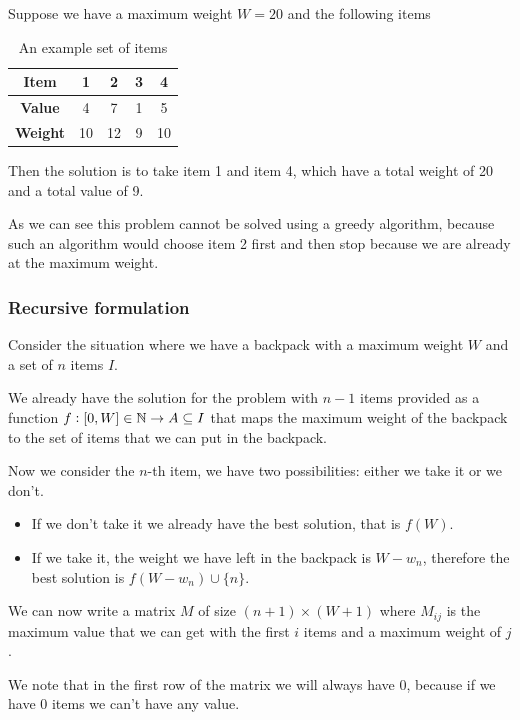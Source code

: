 \documentclass[12pt]{extarticle}
\begin{document}
Suppose we have a maximum weight $W = 20$ and the following items

\begin{table}[H]
    \centering
    \begin{tabular}{ |c|c|c|c|c| }
        \hline
        \textbf{Item}   & 1  & 2  & 3 & 4  \\
        \hline
        \textbf{Value}  & 4  & 7  & 1 & 5  \\
        \textbf{Weight} & 10 & 12 & 9 & 10 \\
        \hline
    \end{tabular}

    \label{tab:knapsack_example}
    \caption{An example set of items}
\end{table}

Then the solution is to take item 1 and item 4, which have a total weight of 20 and a total value of 9.

As we can see this problem cannot be solved using a greedy algorithm, because such an algorithm would choose item 2 first and then stop because we are already at the maximum weight.

\subsubsection{Recursive formulation}

Consider the situation where we have a backpack with a maximum weight $W$ and a set of $n$ items $I$.

We already have the solution for the problem with $n-1$ items provided as a function $f : [0, W] \in \mathbb{N} \to A \subseteq I$ that maps the maximum weight of the backpack to the set of items that we can put in the backpack.

Now we consider the $n$-th item, we have two possibilities: either we take it or we don't.
\begin{itemize}
    \item If we don't take it we already have the best solution, that is $f(W)$.
    \item If we take it, the weight we have left in the backpack is $W - w_n$, therefore the best solution is $f(W - w_n) \cup \{n\}$.
\end{itemize}

We can now write a matrix $M$ of size $(n + 1) \times (W + 1)$ where $M_{ij}$ is the maximum value that we can get with the first $i$ items and a maximum weight of $j$.

We note that in the first row of the matrix we will always have 0, because if we have 0 items we can't have any value.
\end{document}
